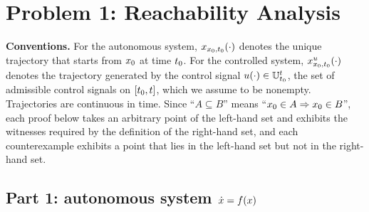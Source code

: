 
\section*{Problem 1: Reachability Analysis}

\noindent\textbf{Conventions.}
For the autonomous system, ${x}_{{x}_0,{t}_0}(\cdot)$ denotes the unique trajectory that starts from
${x}_0$ at time ${t}_0$. For the controlled system, ${x}^{{u}}_{{x}_0,{t}_0}(\cdot)$ denotes the
trajectory generated by the control signal ${u}(\cdot)\in{\mathbb{U}}_{{t}_0}^{{t}}$, the set of admissible control
signals on $[{t}_0,{t}]$, which we assume to be nonempty. Trajectories are continuous in
time. Since ``$A\subseteq B$'' means ``${x}_0\in A \Rightarrow {x}_0\in B$'', each proof
below takes an arbitrary point of the left-hand set and exhibits the witnesses required by the
definition of the right-hand set, and each counterexample exhibits a point that lies in the
left-hand set but not in the right-hand set.

\subsection*{Part 1: autonomous system $\dot{{x}}={f}({x})$}

